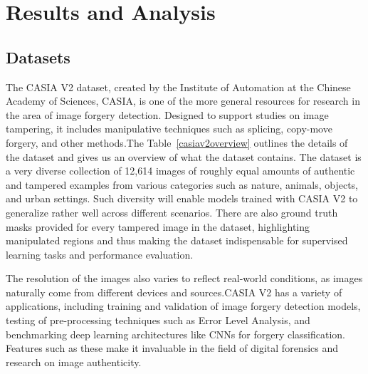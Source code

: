 \documentclass{ieeeaccess}
\begin{document}
\section{Results and Analysis}
	\begin{table}[h!]
\subsection{Datasets}
	The CASIA V2 dataset, created by the Institute of Automation at the Chinese Academy of Sciences, CASIA, is one of the more general resources for research in the area of image forgery detection. Designed to support studies on image tampering, it includes manipulative techniques such as splicing, copy-move forgery, and other methods.The Table~\ref{casiav2overview} outlines the details of the dataset and gives us an overview of what the dataset contains. The dataset is a very diverse collection of 12,614 images of roughly equal amounts of authentic and tampered examples from various categories such as nature, animals, objects, and urban settings. Such diversity will enable models trained with CASIA V2 to generalize rather well across different scenarios. There are also ground truth masks provided for every tampered image in the dataset, highlighting manipulated regions and thus making the dataset indispensable for supervised learning tasks and performance evaluation.
	
	The resolution of the images also varies to reflect real-world conditions, as images naturally come from different devices and sources.CASIA V2 has a variety of applications, including training and validation of image forgery detection models, testing of pre-processing techniques such as Error Level Analysis, and benchmarking deep learning architectures like CNNs for forgery classification. Features such as these make it invaluable in the field of digital forensics and research on image authenticity.
	


\end{table}
\end{document}
